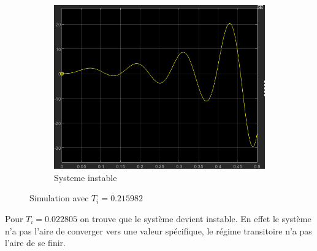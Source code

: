 \documentclass[12pt, a4paper]{report}
\begin{document}
\begin{figure}[H]
    \centering
    \begin{subfigure}[h]{0.6\linewidth}
        \includegraphics[width=\linewidth]{sim2ti4.png}
        \caption{Systeme instable}
    \end{subfigure}
    \caption{Simulation avec $T_i = 0.215982$}
    \label{fig:sim2KTi4}
\end{figure}

Pour $T_i = 0.022805$ on trouve que le système devient instable. En effet le système n'a pas l'aire de converger vers une valeur 
spécifique, le régime transitoire n'a pas l'aire de se finir.
\end{document}
